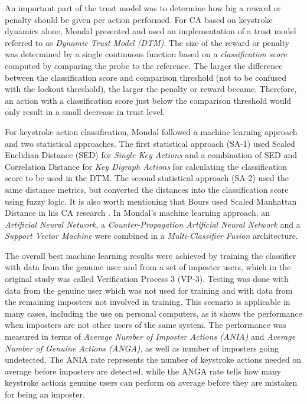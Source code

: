 \documentclass[informationsecurity]{gucmasterproject}
\begin{document}
An important part of the trust model was to determine how big a reward or penalty should be given per action performed.
For CA based on keystroke dynamics alone, Mondal \cite{mondal} presented and used an implementation of a trust model referred to as \textit{Dynamic Trust Model (DTM)}.
The size of the reward or penalty was determined by a single continuous function based on a \textit{classification score} computed by comparing the probe to the reference.
The larger the difference between the classification score and comparison threshold (not to be confused with the lockout threshold), the larger the penalty or reward became.
Therefore, an action with a classification score just below the comparison threshold would only result in a small decrease in trust level.

For keystroke action classification, Mondal followed a machine learning approach and two statistical approaches.
The first statistical approach (SA-1) used Scaled Euclidian Distance (SED) for \textit{Single Key Actions} and a combination of SED and Correlation Distance for \textit{Key Digraph Actions} for calculating the classification score to be used in the DTM. 
The second statistical approach (SA-2) used the same distance metrics, but converted the distances into the classification score using fuzzy logic.
It is also worth mentioning that Bours used Scaled Manhattan Distance in his CA research \cite{BOURS201236}.
In Mondal's \cite{mondal} machine learning approach, an \textit{Artificial Neural Network}, a \textit{Counter-Propagation Artificial Neural Network} and a \textit{Support Vector Machine} were combined in a \textit{Multi-Classifier Fusion} architecture. 

The overall best machine learning results were achieved by training the classifier with data from the genuine user and from a set of imposter users, which in the original study \cite{mondal} was called Verification Process 3 (VP-3).
Testing was done with data from the genuine user which was not used for training and with data from the remaining imposters not involved in training.
This scenario is applicable in many cases, including the use on personal computers, as it shows the performance when imposters are not other users of the same system.
The performance was measured in terms of \textit{Average Number of Imposter Actions (ANIA)} and \textit{Average Number of Genuine Actions (ANGA)}, as well as number of imposters going undetected.
The ANIA rate represents the number of keystroke actions needed on average before imposters are detected, while the ANGA rate tells how many keystroke actions genuine users can perform on average before they are mistaken for being an imposter.
\end{document}
